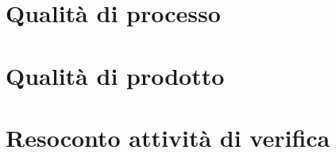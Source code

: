 \documentclass[a4paper, 12pt]{article}
\begin{document}
        \section{Qualità di processo}
        
    \newpage
        \section{Qualità di prodotto}
        
    \newpage
        \appendix
        \section{{Resoconto attività di verifica}}
        
        
\end{document}
